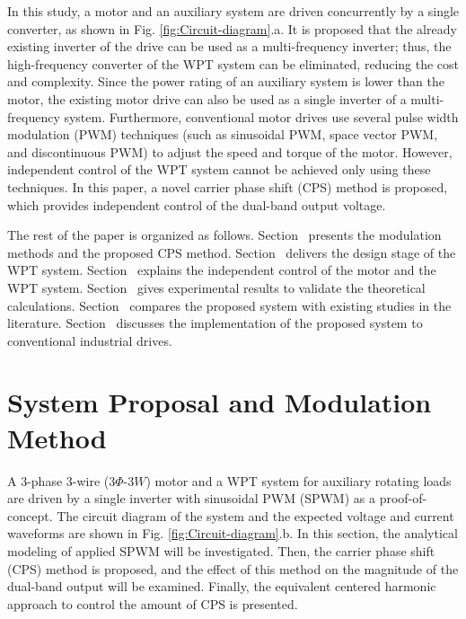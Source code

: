 \documentclass[journal]{IEEEtran}
\newcommand{\RomanNumeralCaps}[1]
    {\MakeUppercase{\romannumeral #1}}
\begin{document}
In this study,  a motor and an auxiliary system are driven concurrently by a single converter, as shown in Fig. \ref{fig:Circuit-diagram}.a. 
It is proposed that the already existing inverter of the drive can be used as a multi-frequency inverter; thus, the high-frequency converter of the WPT system can be eliminated, reducing the cost and complexity. 
Since the power rating of an auxiliary system is lower than the motor, the existing motor drive can also be used as a single inverter of a multi-frequency system.
Furthermore, conventional motor drives use several pulse width modulation (PWM) techniques (such as sinusoidal PWM, space vector PWM, and discontinuous PWM) to adjust the speed and torque of the motor.
However, independent control of the WPT system cannot be achieved only using these techniques. 
In this paper, a novel carrier phase shift (CPS) method is proposed, which provides independent control of the dual-band output voltage. 

The rest of the paper is organized as follows. 
Section~\RomanNumeralCaps{2} presents the modulation methods and the proposed CPS method. 
Section~\RomanNumeralCaps{3} delivers the design stage of the WPT system.
Section~\RomanNumeralCaps{4} explains the independent control of the motor and the WPT system.
Section~\RomanNumeralCaps{5} gives experimental results to validate the theoretical calculations.
Section~\RomanNumeralCaps{6} compares the proposed system with existing studies in the literature. 
Section~\RomanNumeralCaps{7} discusses the implementation of the proposed system to conventional industrial drives.


\section{System Proposal and Modulation Method}
A 3-phase 3-wire ($3\Phi$-$3W$) motor and a WPT system for auxiliary rotating loads are driven by a single inverter with sinusoidal PWM (SPWM) as a proof-of-concept.
The circuit diagram of the system and the expected voltage and current waveforms are shown in Fig. \ref{fig:Circuit-diagram}.b.
In this section, the analytical modeling of applied SPWM will be investigated. Then, the carrier phase shift (CPS) method is proposed, and the effect of this method on the magnitude of the dual-band output will be examined. Finally, the equivalent centered harmonic approach to control the amount of CPS is presented. 
\end{document}
